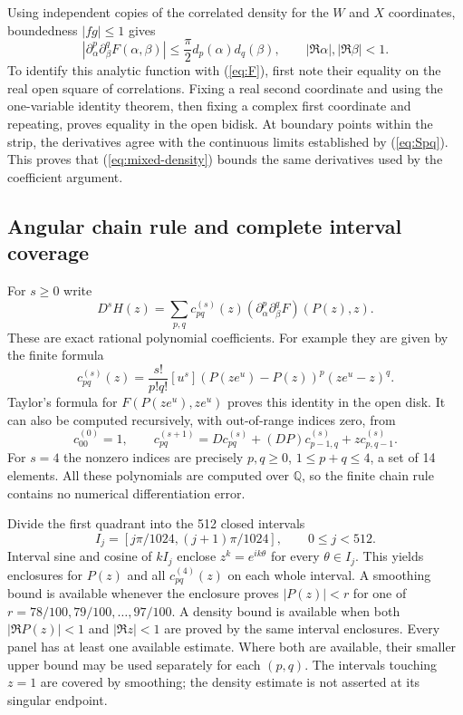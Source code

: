 Using independent copies of the correlated density for the $W$ and $X$
coordinates, boundedness $|fg|\leq1$ gives
\begin{equation}\label{eq:mixed-density}
 |\partial_\alpha^p\partial_\beta^qF(\alpha,\beta)|
 \leq\frac\pi2d_p(\alpha)d_q(\beta),
 \qquad |\Re\alpha|,|\Re\beta|<1.
\end{equation}
To identify this analytic function with (\ref{eq:F}), first note their
equality on the real open square of correlations. Fixing a real second
coordinate and using the one-variable identity theorem, then fixing a
complex first coordinate and repeating, proves equality in the open
bidisk. At boundary points within the strip, the derivatives agree with
the continuous limits established by (\ref{eq:Spq}). This proves that
(\ref{eq:mixed-density}) bounds the same derivatives used by the
coefficient argument.

\subsection{Angular chain rule and complete interval coverage}
For $s\geq0$ write
\[
 D^sH(z)=\sum_{p,q}c^{(s)}_{pq}(z)
               (\partial_\alpha^p\partial_\beta^qF)(P(z),z).
\]
These are exact rational polynomial coefficients. For example they are
given by the finite formula
\begin{equation}\label{eq:angular-jets}
 c^{(s)}_{pq}(z)=\frac{s!}{p!q!}[u^s]
             (P(ze^u)-P(z))^p(ze^u-z)^q.
\end{equation}
Taylor's formula for $F(P(ze^u),ze^u)$ proves this identity in the open
disk. It can also be computed recursively, with out-of-range indices
zero, from
\begin{equation}\label{eq:angular-rec}
 c^{(0)}_{00}=1,\qquad
 c^{(s+1)}_{pq}=D c^{(s)}_{pq}+(DP)c^{(s)}_{p-1,q}+z c^{(s)}_{p,q-1}.
\end{equation}
For $s=4$ the nonzero indices are precisely
$p,q\geq0$, $1\leq p+q\leq4$, a set of 14 elements. All these
polynomials are computed over $\mathbb Q$, so the finite chain rule
contains no numerical differentiation error.

Divide the first quadrant into the 512 closed intervals
\[
 I_j=[j\pi/1024,(j+1)\pi/1024],\qquad 0\leq j<512.
\]
Interval sine and cosine of $kI_j$ enclose $z^k=e^{ik\theta}$ for
every $\theta\in I_j$. This yields enclosures for $P(z)$ and all
$c^{(4)}_{pq}(z)$ on each whole interval. A smoothing bound is available
whenever the enclosure proves $|P(z)|<r$ for one of
$r=78/100,79/100,\ldots,97/100$. A density bound is available when
both $|\Re P(z)|<1$ and $|\Re z|<1$ are proved by the same interval
enclosures. Every panel has at least one available estimate. Where
both are available, their smaller upper bound may be used separately
for each $(p,q)$. The intervals touching $z=1$ are covered by smoothing;
the density estimate is not asserted at its singular endpoint.

